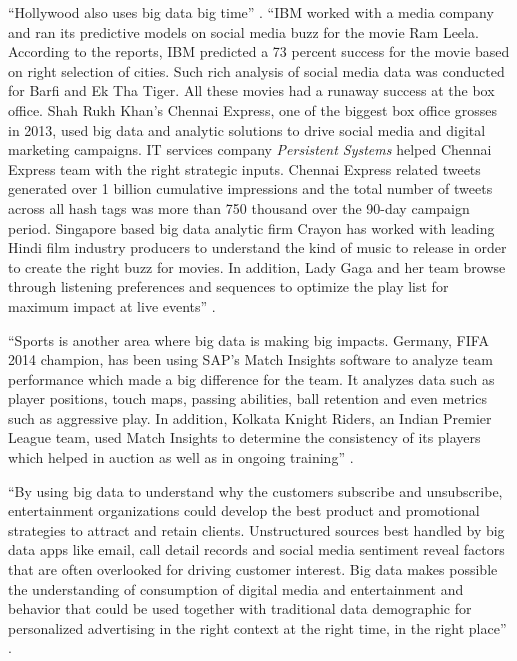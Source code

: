 \documentclass[sigconf]{acmart}
\begin{document}
``Hollywood also uses big data big time'' \cite{Mehta2017entertainment}. ``IBM worked with a media company and ran its predictive models on social media buzz for the movie Ram Leela. According to the reports, IBM predicted a 73 percent success for the movie based on right selection of cities. Such rich analysis of social media data was conducted for Barfi and Ek Tha Tiger. All these movies had a runaway success at the box office. Shah Rukh Khan's Chennai Express, one of the biggest box office grosses in 2013, used big data and analytic solutions to drive social media and digital marketing campaigns. IT services company {\em Persistent Systems} helped Chennai Express team with the right strategic inputs. Chennai Express related tweets generated over 1 billion cumulative impressions and the total number of tweets across all hash tags was more than 750 thousand over the 90-day campaign period. Singapore based big data analytic firm Crayon has worked with leading Hindi film industry producers to understand the kind of music to release in order to create the right buzz for movies. In addition, Lady Gaga and her team browse through listening preferences and sequences to optimize the play list for maximum impact at live events'' \cite{Karania2014industry}.

``Sports is another area where big data is making big impacts. Germany, FIFA 2014 champion, has been using SAP's Match Insights software to analyze team performance which made a big difference for the team. It analyzes data such as player positions, touch maps, passing abilities, ball retention and even metrics such as aggressive play. In addition, Kolkata Knight Riders, an Indian Premier League team, used Match Insights to determine the consistency of its players which helped in auction as well as in ongoing training'' \cite{Karania2014industry}.

``By using big data to understand why the customers subscribe and unsubscribe, entertainment organizations could develop the best product and promotional strategies to attract and retain clients. Unstructured sources best handled by big data apps like email, call detail records and social media sentiment reveal factors that are often overlooked for driving customer interest. Big data makes possible the understanding of consumption of digital media and entertainment and behavior that could be used together with traditional data demographic for personalized advertising in the right context at the right time, in the right place'' \cite{Mehta2017entertainment}. 
\end{document}
